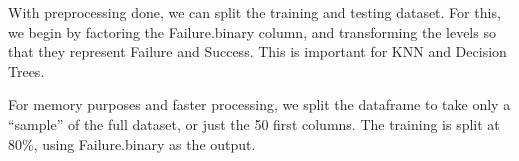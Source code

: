 \documentclass[
]{article}
\newenvironment{Shaded}{\begin{snugshade}}{\end{snugshade}}
\newcommand{\CommentTok}[1]{\textcolor[rgb]{0.56,0.35,0.01}{\textit{#1}}}
\newcommand{\DecValTok}[1]{\textcolor[rgb]{0.00,0.00,0.81}{#1}}
\newcommand{\FunctionTok}[1]{\textcolor[rgb]{0.00,0.00,0.00}{#1}}
\newcommand{\NormalTok}[1]{#1}
\newcommand{\OtherTok}[1]{\textcolor[rgb]{0.56,0.35,0.01}{#1}}
\newcommand{\SpecialCharTok}[1]{\textcolor[rgb]{0.00,0.00,0.00}{#1}}
\newcommand{\StringTok}[1]{\textcolor[rgb]{0.31,0.60,0.02}{#1}}
\begin{document}
With preprocessing done, we can split the training and testing dataset.
For this, we begin by factoring the Failure.binary column, and
transforming the levels so that they represent Failure and Success. This
is important for KNN and Decision Trees.

For memory purposes and faster processing, we split the dataframe to
take only a ``sample'' of the full dataset, or just the 50 first
columns. The training is split at 80\%, using Failure.binary as the
output.

\begin{Shaded}
\end{Shaded}
\end{document}
